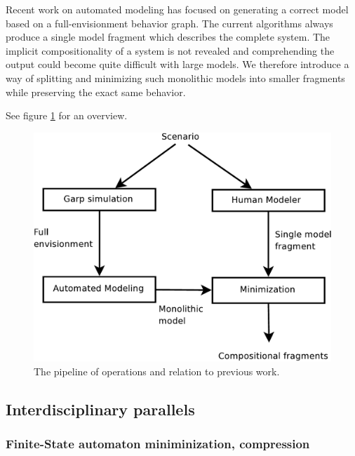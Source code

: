 \documentclass{article} %
\begin{document}
Recent work on automated modeling \cite{buisman, liem, vanweelden} has focused
on generating a correct model based on a full-envisionment behavior graph. The
current algorithms always produce a single model fragment which describes the
complete system. The implicit compositionality of a system is not revealed and
comprehending the output could become quite difficult with large models. We
therefore introduce a way of splitting and minimizing such monolithic models
into smaller fragments while preserving the exact same behavior.

See figure \ref{pipeline} for an overview. %

\begin{figure}[ht]
\centering
\includegraphics[scale=0.5]{pipeline-crop.pdf}
\caption{The pipeline of operations and relation to previous work.}
\label{pipeline}
\end{figure}

\subsection{Interdisciplinary parallels}


\subsubsection{Finite-State automaton miniminization, compression}
\end{document}
